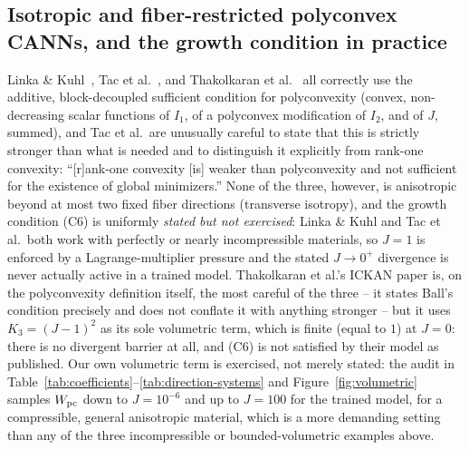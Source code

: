\documentclass[10pt,a4paper]{article}
\begin{document}
\subsection{Isotropic and fiber-restricted polyconvex CANNs, and the growth condition in practice}
\label{sec:related-cann}
Linka \& Kuhl~\cite{Linka2023}, Tac et al.~\cite{Tac2023}, and
Thakolkaran et al.~\cite{Thakolkaran2025} all correctly use the additive,
block-decoupled sufficient condition for polyconvexity (convex,
non-decreasing scalar functions of $I_1$, of a polyconvex modification of
$I_2$, and of $J$, summed), and Tac et al.\ are unusually careful to state
that this is strictly stronger than what is needed and to distinguish it
explicitly from rank-one convexity: ``[r]ank-one convexity [is] weaker
than polyconvexity and not sufficient for the existence of global
minimizers.'' None of the three, however, is anisotropic beyond at most two
fixed fiber directions (transverse isotropy), and the growth condition
(C6) is uniformly \emph{stated but not exercised}: Linka \& Kuhl and Tac et
al.\ both work with perfectly or nearly incompressible materials, so $J=1$
is enforced by a Lagrange-multiplier pressure and the stated $J\to0^+$
divergence is never actually active in a trained model. Thakolkaran et
al.'s ICKAN paper is, on the polyconvexity definition itself, the most
careful of the three -- it states Ball's condition precisely and does not
conflate it with anything stronger -- but it uses $K_3=(J-1)^2$ as its sole
volumetric term, which is finite (equal to $1$) at $J=0$: there is no
divergent barrier at all, and (C6) is not satisfied by their model as
published. Our own volumetric term is exercised, not merely stated: the
audit in Table~\ref{tab:coefficients}--\ref{tab:direction-systems} and
Figure~\ref{fig:volumetric} samples $W_{\rm pc}$ down to $J=10^{-6}$ and up
to $J=100$ for the trained model, for a compressible, general anisotropic
material, which is a more demanding setting than any of the three
incompressible or bounded-volumetric examples above.
\end{document}
